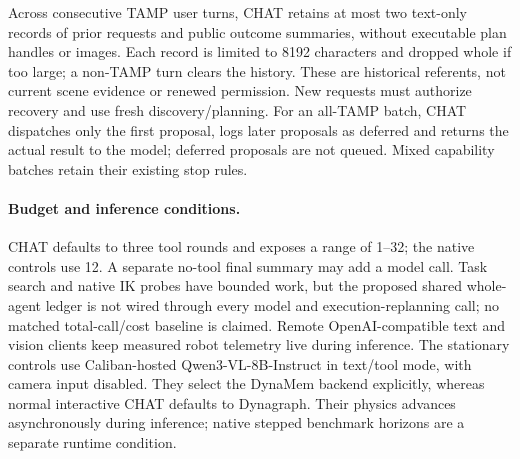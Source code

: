 Across consecutive TAMP user turns, CHAT retains at most two text-only records
of prior requests and public outcome summaries, without executable plan handles
or images. Each record is limited to 8192 characters and dropped whole if too
large; a non-TAMP turn clears the history. These are historical referents, not
current scene evidence or renewed permission. New requests must authorize
recovery and use fresh discovery/planning. For an all-TAMP batch, CHAT dispatches
only the first proposal, logs later proposals as deferred and returns the actual
result to the model; deferred proposals are not queued. Mixed capability batches
retain their existing stop rules.

\paragraph{Budget and inference conditions.}
CHAT defaults to three tool rounds and exposes a range of 1--32; the native
controls use 12. A separate no-tool final summary may add a model call. Task
search and native IK probes have bounded work, but the proposed shared
whole-agent ledger is not wired through every model and execution-replanning
call; no matched total-call/cost baseline is claimed. Remote OpenAI-compatible
text and vision clients keep measured robot telemetry live during inference.
The stationary controls use Caliban-hosted Qwen3-VL-8B-Instruct in text/tool mode,
with camera input disabled. They select the DynaMem backend explicitly, whereas
normal interactive CHAT defaults to Dynagraph. Their physics advances
asynchronously during inference; native stepped benchmark horizons are a
separate runtime condition.

